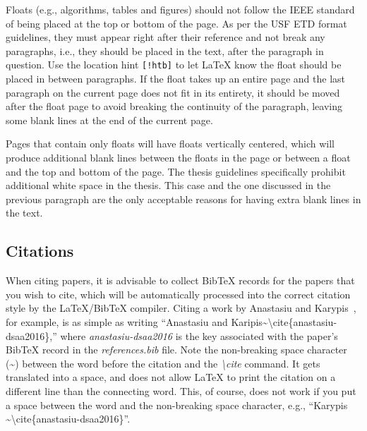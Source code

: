 Floats (e.g., algorithms, tables and figures) should not follow the IEEE standard of being placed at the top or bottom of the page. As per the USF ETD format guidelines, they must appear right after their reference and not break any paragraphs, i.e., they should be placed in the text, after the paragraph in question. Use the location hint \texttt{[!htb]} to let LaTeX know the float should be placed in between paragraphs. If the float takes up an entire page and the last paragraph on the current page does not fit in its entirety, it should be moved after the float page to avoid breaking the continuity of the paragraph, leaving some blank lines at the end of the current page.

Pages that contain only floats will have floats vertically centered, which will produce additional blank lines between the floats in the page or between a float and the top and bottom of the page. The thesis guidelines specifically prohibit additional white space in the thesis. This case and the one discussed in the previous paragraph are the only acceptable reasons for having extra blank lines in the text.

\subsection{Citations}\label{sec:latex:citations}
When citing papers, it is advisable to collect BibTeX records for the papers that you wish to cite, which will be automatically processed into the correct citation style by the LaTeX/BibTeX compiler. Citing a work by Anastasiu and Karypis~\cite{anastasiu-dsaa2016}, for example, is as simple as writing ``Anastasiu and Karipis\textasciitilde{\textbackslash}cite\{anastasiu-dsaa2016\},'' where \textit{anastasiu-dsaa2016} is the key associated with the paper's BibTeX record in the \textit{references.bib} file. Note the non-breaking space character (\textasciitilde) between the word before the citation and the \textit{{\textbackslash}cite} command. It gets translated into a space, and does not allow LaTeX to print the citation on a different line than the connecting word. This, of course, does not work if you put a space between the word and the non-breaking space character, e.g., ``Karypis \textasciitilde{\textbackslash}cite\{anastasiu-dsaa2016\}''.

